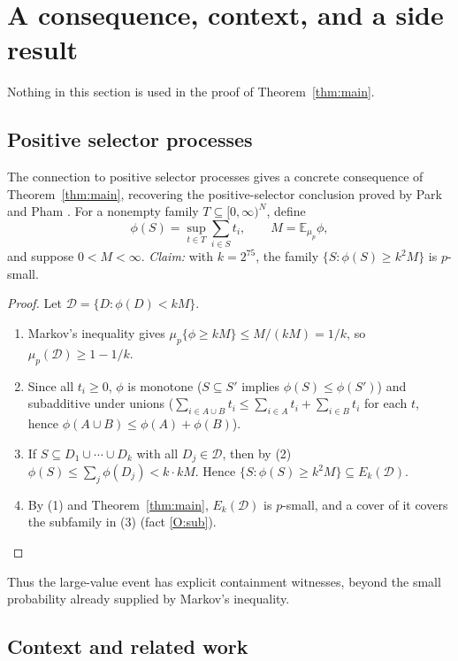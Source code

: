 \documentclass[11pt,letterpaper]{article}
\theoremstyle{definition}
\theoremstyle{remark}
\numberwithin{equation}{section}
\begin{document}
\section{A consequence, context, and a side result}
\label{sec:context}

Nothing in this section is used in the proof of Theorem~\ref{thm:main}.

\subsection{Positive selector processes}

The connection to positive selector processes
\cite[Section~7]{Talagrand10} gives a concrete consequence of
Theorem~\ref{thm:main}, recovering the positive-selector conclusion proved
by Park and Pham \cite[Theorem~1.2]{ParkPham24}. For a nonempty family
$T\subseteq[0,\infty)^N$, define
\[
\phi(S)=\sup_{t\in T}\sum_{i\in S}t_i,
\qquad M=\mathbb E_{\mu_p}\phi,
\]
and suppose $0<M<\infty$. \emph{Claim:} with $k=2^{75}$, the family
$\{S:\phi(S)\ge k^2M\}$ is $p$-small.

\begin{proof}
Let $\mathcal D=\{D:\phi(D)<kM\}$.
\begin{enumerate}[label=(\arabic*)]
\item Markov's inequality gives
$\mu_p\{\phi\ge kM\}\le M/(kM)=1/k$, so $\mu_p(\mathcal D)\ge1-1/k$.
\item Since all $t_i\ge0$, $\phi$ is monotone ($S\subseteq S'$ implies
$\phi(S)\le\phi(S')$) and subadditive under unions
($\sum_{i\in A\cup B}t_i\le\sum_{i\in A}t_i+\sum_{i\in B}t_i$ for each
$t$, hence $\phi(A\cup B)\le\phi(A)+\phi(B)$).
\item If $S\subseteq D_1\cup\cdots\cup D_k$ with all
$D_j\in\mathcal D$, then by (2)
$\phi(S)\le\sum_j\phi(D_j)<k\cdot kM$. Hence
$\{S:\phi(S)\ge k^2M\}\subseteq E_k(\mathcal D)$.
\item By (1) and Theorem~\ref{thm:main}, $E_k(\mathcal D)$ is $p$-small,
and a cover of it covers the subfamily in (3) (fact \ref{O:sub}).
\qedhere
\end{enumerate}
\end{proof}

Thus the large-value event has explicit containment witnesses, beyond the
small probability already supplied by Markov's inequality.

\subsection{Context and related work}
\end{document}
